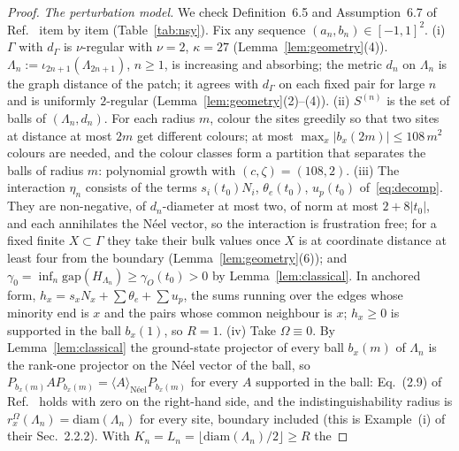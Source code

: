 \documentclass[aps,prx,onecolumn,10pt,nofootinbib,longbibliography,floatfix]{revtex4-2}
\theoremstyle{remark}
\begin{document}
\begin{proof}
\emph{The perturbation model.} We check Definition~6.5 and Assumption~6.7 of Ref.~\cite{nsy2022} item by item %
(Table~\ref{tab:nsy}). Fix any sequence $(a_n,b_n)\in[-1,1]^2$.
(i) $\Gamma$ with $d_\Gamma$ is $\nu$-regular with $\nu=2$, $\kappa=27$ (Lemma~\ref{lem:geometry}(4)). %
$\Lambda_n:=\iota_{2n+1}(\Lambda_{2n+1})$, $n\ge1$, is increasing and absorbing; the metric $d_n$ on $\Lambda_n$ is the graph
distance of the patch; it agrees with $d_\Gamma$ on each fixed pair for large $n$ and is uniformly $2$-regular %
(Lemma~\ref{lem:geometry}(2)--(4)). %
(ii) $S^{(n)}$ is the set of balls of $(\Lambda_n,d_n)$. For each radius $m$, colour the sites greedily so that two
sites at distance at most $2m$ get different colours; at most $\max_x|b_x(2m)|\le108\,m^2$ colours are needed, and
the colour classes form a partition that separates the balls of radius $m$: polynomial growth with $(c,\zeta)=(108,2)$. %
(iii) The interaction $\eta_n$ consists of the terms $s_i(t_0)N_i$, $\theta_e(t_0)$, $u_p(t_0)$ of~\eqref{eq:decomp}. They
are non-negative, of $d_n$-diameter at most two, of norm at most $2+8|t_0|$, and each annihilates the N\'eel vector, so the
interaction is frustration free; for a fixed finite $X\subset\Gamma$ they take their bulk values once $X$ is at
coordinate distance at least four from the boundary (Lemma~\ref{lem:geometry}(6)); and %
$\gamma_0=\inf_n\mathrm{gap}(H_{\Lambda_n})\ge\gamma_O(t_0)>0$ by Lemma~\ref{lem:classical}. In anchored form,
$h_x=s_xN_x+\sum\theta_e+\sum u_p$, the sums running over the edges whose minority end is $x$ and the pairs whose common
neighbour is $x$; $h_x\ge0$ is supported in the ball $b_x(1)$, so $R=1$.
(iv) Take $\Omega\equiv0$. By Lemma~\ref{lem:classical} the ground-state projector of every ball $b_x(m)$ of $\Lambda_n$ is
the rank-one projector on the N\'eel vector of the ball, so $P_{b_x(m)}AP_{b_x(m)}=\langle A\rangle_{\text{N\'eel}}P_{b_x(m)}$
for every $A$ supported in the ball: Eq.~(2.9) of Ref.~\cite{nsy2022} holds with zero on the right-hand side, and %
the indistinguishability radius is $r^\Omega_x(\Lambda_n)=\mathrm{diam}(\Lambda_n)$ for every site, boundary included
(this is Example~(i) of their Sec.~2.2.2). With $K_n=L_n=\lfloor\mathrm{diam}(\Lambda_n)/2\rfloor\ge R$ the %

\end{proof}
\end{document}
